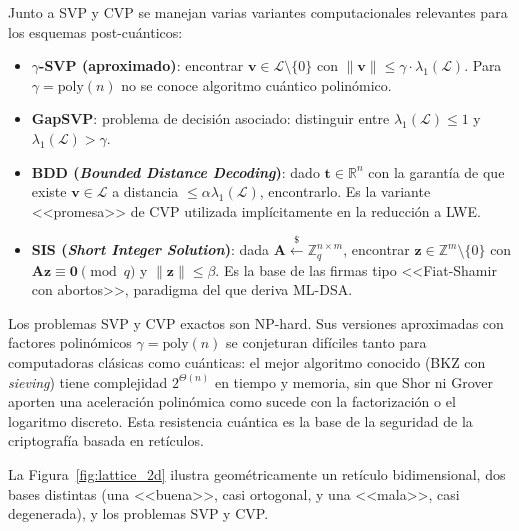 Junto a SVP y CVP se manejan varias variantes computacionales relevantes para los esquemas post-cuánticos:

\begin{itemize}
  \item \textbf{$\gamma$-SVP (aproximado)}: encontrar $\mathbf{v} \in \mathcal{L} \setminus \{0\}$ con $\|\mathbf{v}\| \leq \gamma \cdot \lambda_1(\mathcal{L})$. Para $\gamma = \text{poly}(n)$ no se conoce algoritmo cuántico polinómico.
  \item \textbf{GapSVP}: problema de decisión asociado: distinguir entre $\lambda_1(\mathcal{L}) \leq 1$ y $\lambda_1(\mathcal{L}) > \gamma$.
  \item \textbf{BDD (\emph{Bounded Distance Decoding})}: dado $\mathbf{t} \in \mathbb{R}^n$ con la garantía de que existe $\mathbf{v} \in \mathcal{L}$ a distancia $\leq \alpha \lambda_1(\mathcal{L})$, encontrarlo. Es la variante <<promesa>> de CVP utilizada implícitamente en la reducción a LWE.
  \item \textbf{SIS (\emph{Short Integer Solution})}: dada $\mathbf{A} \xleftarrow{\$} \mathbb{Z}_q^{n \times m}$, encontrar $\mathbf{z} \in \mathbb{Z}^m \setminus \{0\}$ con $\mathbf{A}\mathbf{z} \equiv \mathbf{0} \pmod{q}$ y $\|\mathbf{z}\| \leq \beta$. Es la base de las firmas tipo <<Fiat-Shamir con abortos>>, paradigma del que deriva ML-DSA.
\end{itemize}

Los problemas SVP y CVP exactos son NP-hard. Sus versiones aproximadas con factores polinómicos $\gamma = \text{poly}(n)$ se conjeturan difíciles tanto para computadoras clásicas como cuánticas: el mejor algoritmo conocido (BKZ con \emph{sieving}) tiene complejidad $2^{\Theta(n)}$ en tiempo y memoria, sin que Shor ni Grover aporten una aceleración polinómica como sucede con la factorización o el logaritmo discreto. Esta resistencia cuántica es la base de la seguridad de la criptografía basada en retículos.

La Figura~\ref{fig:lattice_2d} ilustra geométricamente un retículo bidimensional, dos bases distintas (una <<buena>>, casi ortogonal, y una <<mala>>, casi degenerada), y los problemas SVP y CVP.

